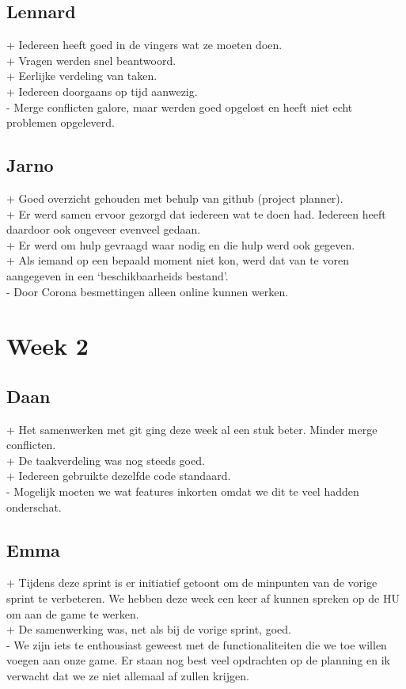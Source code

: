\documentclass{article}
\begin{document}
\subsection{Lennard} %
\label{sub:lennard}
+ Iedereen heeft goed in de vingers wat ze moeten doen.\\
+ Vragen werden snel beantwoord.\\
+ Eerlijke verdeling van taken.\\
+ Iedereen doorgaans op tijd aanwezig.\\
- Merge conflicten galore, maar werden goed opgelost en heeft niet echt problemen opgeleverd.

\subsection{Jarno} %
\label{sub:jarno}
+ Goed overzicht gehouden met behulp van github (project planner).\\
+ Er werd samen ervoor gezorgd dat iedereen wat te doen had. Iedereen heeft daardoor ook ongeveer evenveel gedaan.\\
+ Er werd om hulp gevraagd waar nodig en die hulp werd ook gegeven.\\
+ Als iemand op een bepaald moment niet kon, werd dat van te voren aangegeven in een ‘beschikbaarheids bestand’.\\
- Door Corona besmettingen alleen online kunnen werken.

\section{Week 2} %
\label{sec:week_2}

\subsection{Daan} %
\label{sub:daan}
+ Het samenwerken met git ging deze week al een stuk beter. Minder merge conflicten.\\
+ De taakverdeling was nog steeds goed.\\
+ Iedereen gebruikte dezelfde code standaard.\\
- Mogelijk moeten we wat features inkorten omdat we dit te veel hadden onderschat.

\subsection{Emma} %
\label{sub:emma}
+ Tijdens deze sprint is er initiatief getoont om de minpunten van de vorige sprint te verbeteren. We hebben deze week een keer af kunnen spreken op de HU om aan de game te werken.\\
+ De samenwerking was, net als bij de vorige sprint, goed.\\
- We zijn iets te enthousiast geweest met de functionaliteiten die we toe willen voegen aan onze game. Er staan nog best veel opdrachten op de planning en ik verwacht dat we ze niet allemaal af zullen krijgen.
\end{document}
